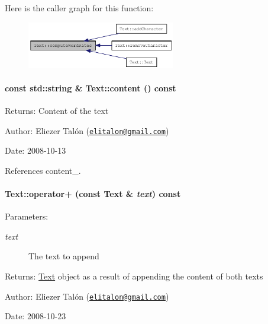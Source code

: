Here is the caller graph for this function:\nopagebreak
\begin{figure}[H]
\begin{center}
\leavevmode
\includegraphics[width=184pt]{class_text_e954a35628c72537e2ee5ca6e9609ac1_icgraph}
\end{center}
\end{figure}
\hypertarget{class_text_8b6ac381338c5b3f719600b5f9be222c}{
\paragraph[{content}]{\setlength{\rightskip}{0pt plus 5cm}const std::string \& Text::content () const}\hfill}
\label{class_text_8b6ac381338c5b3f719600b5f9be222c}


\begin{Desc}
\item[Returns:]Content of the text\end{Desc}
\begin{Desc}
\item[Author:]Eliezer Talón (\href{mailto:elitalon@gmail.com}{\tt elitalon@gmail.com}) \end{Desc}
\begin{Desc}
\item[Date:]2008-10-13 \end{Desc}


References content\_\-.\hypertarget{class_text_c8887fb224e0402448ede4f3b9f7452d}{
\paragraph[{operator+}]{ Text::operator+ (const {\bf Text} \& {\em text}) const}\hfill}
\label{class_text_c8887fb224e0402448ede4f3b9f7452d}


\begin{Desc}
\item[Parameters:]
\begin{description}
\item[{\em text}]The text to append\end{description}
\end{Desc}
\begin{Desc}
\item[Returns:]\hyperlink{class_text}{Text} object as a result of appending the content of both texts\end{Desc}
\begin{Desc}
\item[Author:]Eliezer Talón (\href{mailto:elitalon@gmail.com}{\tt elitalon@gmail.com}) \end{Desc}
\begin{Desc}
\item[Date:]2008-10-23 \end{Desc}


